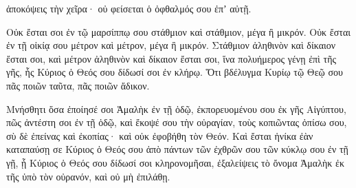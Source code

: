{ἀποκόψεις τὴν χεῖρα· οὐ φείσεται ὁ ὀφθαλμός σου ἐπʼ αὐτῇ.
\par }{\PP {}Οὐκ ἔσται σοι ἐν τῷ μαρσίππῳ σου στάθμιον καὶ στάθμιον, μέγα ἢ μικρόν.
Οὐκ ἔσται ἐν τῇ οἰκίᾳ σου μέτρον καὶ μέτρον, μέγα ἢ μικρόν.
Στάθμιον ἀληθινὸν καὶ δίκαιον ἔσται σοι, καὶ μέτρον ἀληθινὸν καὶ δίκαιον ἔσται σοι, ἵνα πολυήμερος γένῃ ἐπὶ τῆς γῆς, ἧς Κύριος ὁ Θεός σου δίδωσί σοι ἐν κλήρῳ.
Ὅτι βδέλυγμα Κυρίῳ τῷ Θεῷ σου πᾶς ποιῶν ταῦτα, πᾶς ποιῶν ἄδικον.
\par }{\PP {}Μνήσθητι ὅσα ἐποίησέ σοι Ἀμαλὴκ ἐν τῇ ὁδῷ, ἐκπορευομένου σου ἐκ γῆς Αἰγύπτου,
πῶς ἀντέστη σοι ἐν τῇ ὁδῷ, καὶ ἔκοψέ σου τὴν οὐραγίαν, τοὺς κοπιῶντας ὀπίσω σου, σὺ δὲ ἐπείνας καὶ ἐκοπίας· καὶ οὐκ ἐφοβήθη τὸν Θεόν.
Καὶ ἔσται ἡνίκα ἐὰν καταπαύσῃ σε Κύριος ὁ Θεός σου ἀπὸ πάντων τῶν ἐχθρῶν σου τῶν κύκλῳ σου ἐν τῇ γῇ, ᾗ Κύριος ὁ Θεός σου δίδωσί σοι κληρονομῆσαι, ἐξαλείψεις τὸ ὄνομα Ἀμαλὴκ ἐκ τῆς ὑπὸ τὸν οὐρανόν, καὶ οὐ μὴ ἐπιλάθῃ.

}
